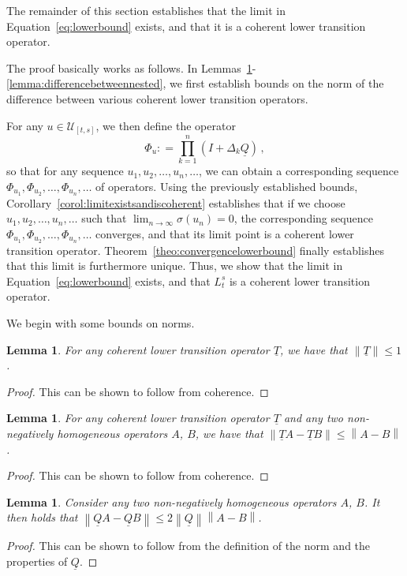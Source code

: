 \documentclass[10pt]{paper}
\newtheorem{lemma}[theorem]{Lemma}
\newcommand{\lt}{\underline{T}}
\newcommand{\lrate}{\underline{Q}}
\newcommand{\norm}[1]{\left\lVert #1 \right\rVert}
\newcommand{\coloneqq}{:\!=}
\begin{document}
\noindent The remainder of this section establishes that the limit in Equation~\eqref{eq:lowerbound} exists, and that it is a coherent lower transition operator.

The proof basically works as follows. In Lemmas~\ref{lemma:normofcoherenttrans}-\ref{lemma:differencebetweennested}, we first establish bounds on the norm of the difference between various coherent lower transition operators.

For any $u\in\mathcal{U}_{[t,s]}$, we then define the operator
\begin{equation*}
\Phi_u\coloneqq\prod_{k=1}^n(I+\Delta_k\lrate)\,,
\end{equation*}
so that for any sequence $u_1,u_2,\ldots,u_n,\ldots$, we can obtain a corresponding sequence $\Phi_{u_1},\Phi_{u_2},\ldots,\Phi_{u_n},\ldots$ of operators. Using the previously established bounds, Corollary~\ref{corol:limitexistsandiscoherent} establishes that if we choose $u_1,u_2,\ldots,u_n,\ldots$ such that $\lim_{n\rightarrow\infty}\sigma(u_n)=0$, the corresponding sequence $\Phi_{u_1},\Phi_{u_2},\ldots,\Phi_{u_n},\ldots$ converges, and that its limit point is a coherent lower transition operator. Theorem~\ref{theo:convergencelowerbound} finally establishes that this limit is furthermore unique. Thus, we show that the limit in Equation~\eqref{eq:lowerbound} exists, and that $L_t^s$ is a coherent lower transition operator. 

We begin with some bounds on norms.

\begin{lemma}\label{lemma:normofcoherenttrans}
For any coherent lower transition operator $\lt$, we have that $\norm{\lt}\leq 1$.
\end{lemma}
\begin{proof}
This can be shown to follow from coherence.
\end{proof}

\begin{lemma}\label{lemma:differencenormofcoherenttrans}
For any coherent lower transition operator $\lt$ and any two non-negatively homogeneous operators $A$, $B$, we have that $\norm{\lt A-\lt B}\leq \norm{A-B}$.
\end{lemma}
\begin{proof}
This can be shown to follow from coherence.
\end{proof}

\begin{lemma}\label{lemma:differencenormofcoherenttransrate}
Consider any two non-negatively homogeneous operators $A$, $B$. It then holds that $\norm{\lrate A-\lrate B}\leq 2\norm{\lrate}\norm{A-B}$.
\end{lemma}
\begin{proof}
This can be shown to follow from the definition of the norm and the properties of $\lrate$.
\end{proof}
\end{document}
